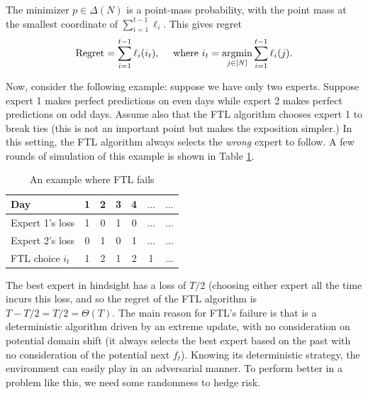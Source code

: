 The minimizer $p \in \Delta(N)$ is a point-mass probability, with the point mass at the smallest coordinate of $\sum_{i=1}^{t-1} \ell_i$. This gives regret
\begin{equation}
\text{Regret} = \sum_{i=1}^{t-1} \ell_i(i_t),
\quad \text{ where } i_t = \operatorname*{\textup{argmin}}_{j \in [N]} \sum_{i=1}^{t-1}\ell_i(j).
\end{equation}
    
Now, consider the following example: suppose we have only two experts. Suppose expert 1 makes perfect predictions on even days while expert 2 makes perfect predictions on odd days. Assume also that the FTL algorithm chooses expert 1 to break ties (this is not an important point but makes the exposition simpler.) In this setting, the FTL algorithm always selects the \textit{wrong} expert to follow. A few rounds of simulation of this example is shown in Table \ref{lec15:tab:counter example}.

    \begin{table}[h]
        \caption{An example where FTL fails}
        \label{lec15:tab:counter example}
        \medbreak
        \centering
        \small
        \begin{tabular}{l|c c c c c c}
        \toprule
        Day & 1 & 2 & 3 & 4 & $\dots$ & $\dots$ \\
        \midrule 
        Expert 1's loss & 1 & 0 & 1 & 0 & $\dots$ & $\dots$ \\
        Expert 2's loss & 0 & 1 & 0 & 1 & $\dots$ & $\dots$ \\
        \midrule 
        \midrule 
        FTL choice $i_t$ & 1 & 2 & 1 & 2 & 1 & $\dots$ \\
        \bottomrule
        \end{tabular}
    \end{table}

The best expert in hindsight has a loss of $T/2$ (choosing either expert all the time incurs this loss, and so the regret of the FTL algorithm is $T - T/2 = T/2 = \Theta(T)$. The main reason for FTL's failure is that is a deterministic algorithm driven by an extreme update, with no consideration on potential domain shift (it always selects the best expert based on the past with no consideration of the potential next $f_t$). Knowing its deterministic strategy, the environment can easily play in an adversarial manner. To perform better in a problem like this, we need some randomness to hedge risk.
